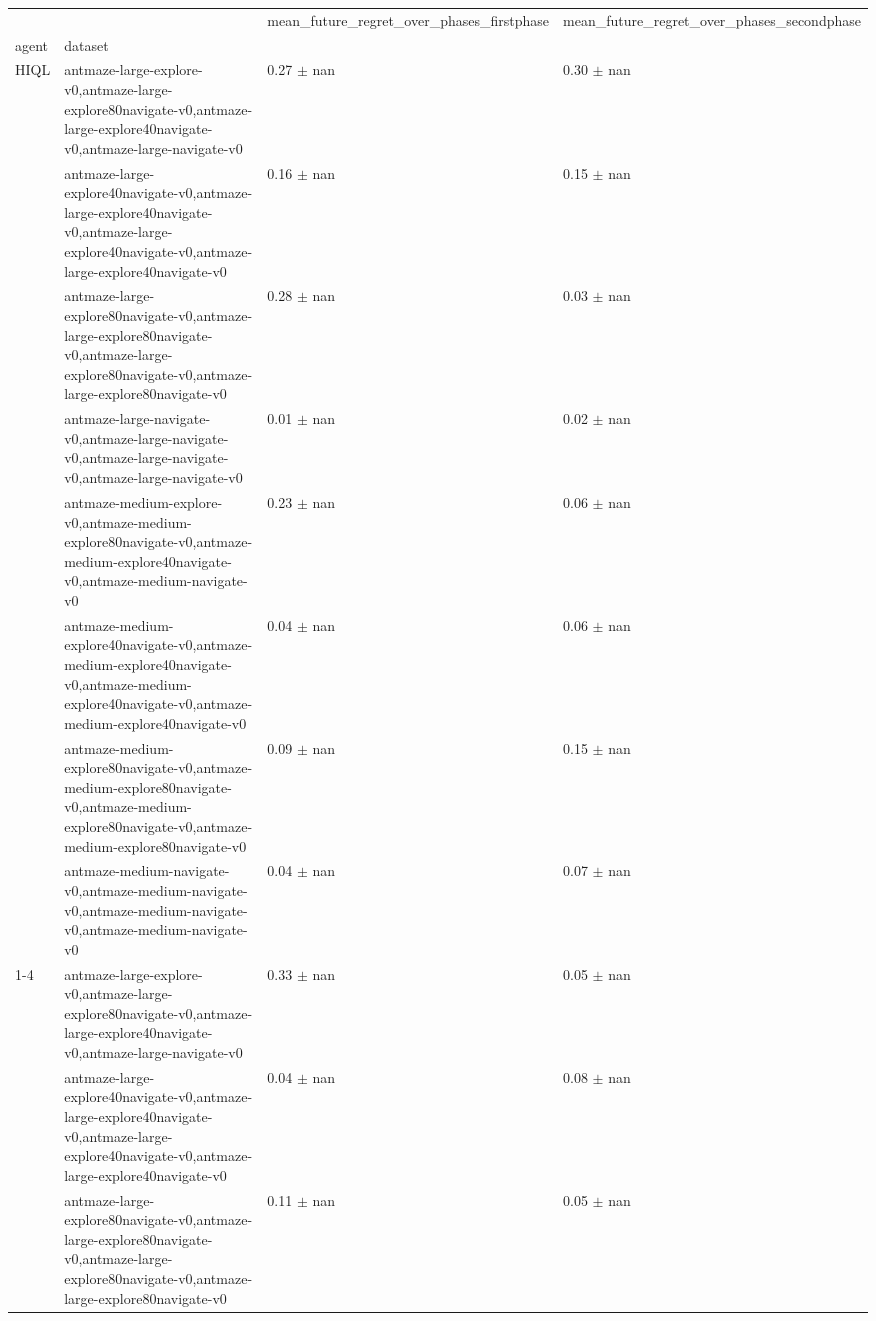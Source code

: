\begin{tabular}{llll}
\toprule
 &  & mean_future_regret_over_phases_firstphase & mean_future_regret_over_phases_secondphase \\
agent & dataset &  &  \\
\midrule
\multirow[t]{8}{*}{HIQL} & antmaze-large-explore-v0,antmaze-large-explore80navigate-v0,antmaze-large-explore40navigate-v0,antmaze-large-navigate-v0 & 0.27 $\pm$ nan & 0.30 $\pm$ nan \\
 & antmaze-large-explore40navigate-v0,antmaze-large-explore40navigate-v0,antmaze-large-explore40navigate-v0,antmaze-large-explore40navigate-v0 & 0.16 $\pm$ nan & 0.15 $\pm$ nan \\
 & antmaze-large-explore80navigate-v0,antmaze-large-explore80navigate-v0,antmaze-large-explore80navigate-v0,antmaze-large-explore80navigate-v0 & 0.28 $\pm$ nan & 0.03 $\pm$ nan \\
 & antmaze-large-navigate-v0,antmaze-large-navigate-v0,antmaze-large-navigate-v0,antmaze-large-navigate-v0 & 0.01 $\pm$ nan & 0.02 $\pm$ nan \\
 & antmaze-medium-explore-v0,antmaze-medium-explore80navigate-v0,antmaze-medium-explore40navigate-v0,antmaze-medium-navigate-v0 & 0.23 $\pm$ nan & 0.06 $\pm$ nan \\
 & antmaze-medium-explore40navigate-v0,antmaze-medium-explore40navigate-v0,antmaze-medium-explore40navigate-v0,antmaze-medium-explore40navigate-v0 & 0.04 $\pm$ nan & 0.06 $\pm$ nan \\
 & antmaze-medium-explore80navigate-v0,antmaze-medium-explore80navigate-v0,antmaze-medium-explore80navigate-v0,antmaze-medium-explore80navigate-v0 & 0.09 $\pm$ nan & 0.15 $\pm$ nan \\
 & antmaze-medium-navigate-v0,antmaze-medium-navigate-v0,antmaze-medium-navigate-v0,antmaze-medium-navigate-v0 & 0.04 $\pm$ nan & 0.07 $\pm$ nan \\
\cline{1-4}
\multirow[t]{8}{*}{QRL} & antmaze-large-explore-v0,antmaze-large-explore80navigate-v0,antmaze-large-explore40navigate-v0,antmaze-large-navigate-v0 & 0.33 $\pm$ nan & 0.05 $\pm$ nan \\
 & antmaze-large-explore40navigate-v0,antmaze-large-explore40navigate-v0,antmaze-large-explore40navigate-v0,antmaze-large-explore40navigate-v0 & 0.04 $\pm$ nan & 0.08 $\pm$ nan \\
 & antmaze-large-explore80navigate-v0,antmaze-large-explore80navigate-v0,antmaze-large-explore80navigate-v0,antmaze-large-explore80navigate-v0 & 0.11 $\pm$ nan & 0.05 $\pm$ nan \\

\end{tabular}
